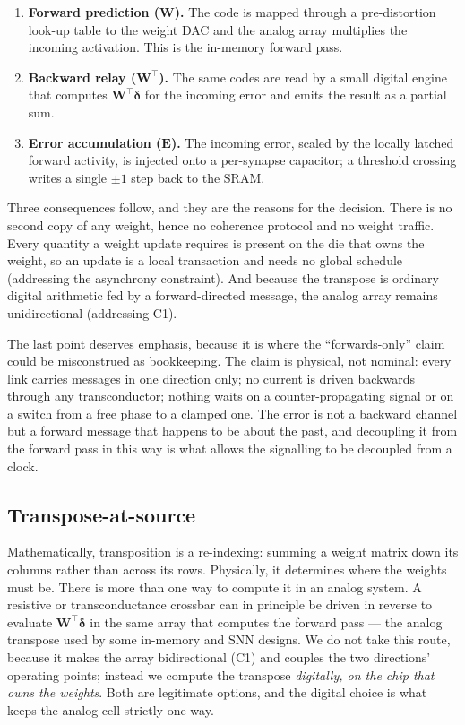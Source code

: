 \documentclass[11pt]{article}
\newcommand{\W}{\bm W}
\newcommand{\bdelta}{\bm\delta}
\newcommand{\E}{\bm E}
\begin{document}
\begin{enumerate}
\item \textbf{Forward prediction ($\W$).} The code is mapped through a pre-distortion look-up table
to the weight DAC and the analog array multiplies the incoming activation. This is the in-memory
forward pass.
\item \textbf{Backward relay ($\W^{\!\top}$).} The same codes are read by a small digital engine
that computes $\W^{\!\top}\bdelta$ for the incoming error and emits the result as a partial sum.
\item \textbf{Error accumulation ($\E$).} The incoming error, scaled by the locally latched forward
activity, is injected onto a per-synapse capacitor; a threshold crossing writes a single $\pm1$ step
back to the SRAM.
\end{enumerate}

Three consequences follow, and they are the reasons for the decision. There is no second copy of any
weight, hence no coherence protocol and no weight traffic. Every quantity a weight update requires is
present on the die that owns the weight, so an update is a local transaction and needs no global
schedule (addressing the asynchrony constraint). And because the transpose is ordinary digital
arithmetic fed by a forward-directed message, the analog array remains unidirectional (addressing
C1).

The last point deserves emphasis, because it is where the ``forwards-only'' claim could be
misconstrued as bookkeeping. The claim is physical, not nominal: every link carries messages in one
direction only; no current is driven backwards through any transconductor; nothing waits on a
counter-propagating signal or on a switch from a free phase to a clamped one. The error is not a
backward channel but a forward message that happens to be about the past, and decoupling it from the
forward pass in this way is what allows the signalling to be decoupled from a clock.

\subsection{Transpose-at-source}\label{sec:transpose}

Mathematically, transposition is a re-indexing: summing a weight matrix down its columns rather than
across its rows. Physically, it determines where the weights must be. There is more than one way to
compute it in an analog system. A resistive or transconductance crossbar can in principle be driven
in reverse to evaluate $\W^{\!\top}\bdelta$ in the same array that computes the forward pass --- the
analog transpose used by some in-memory and SNN designs. We do not take this route, because it makes
the array bidirectional (C1) and couples the two directions' operating points; instead we compute the
transpose \emph{digitally, on the chip that owns the weights}. Both are legitimate options, and the
digital choice is what keeps the analog cell strictly one-way.
\end{document}
